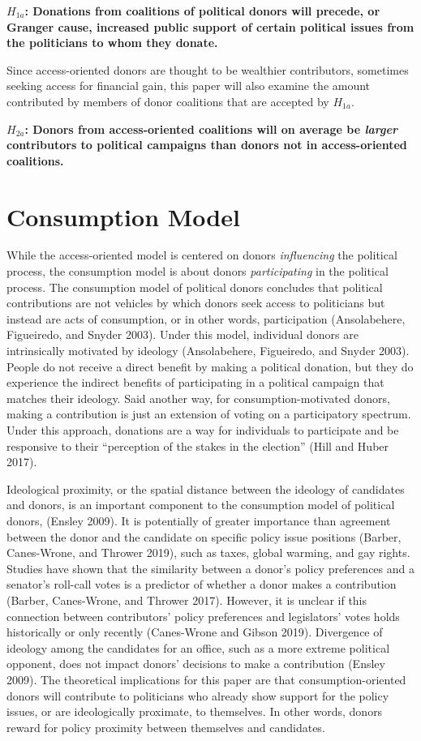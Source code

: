 \documentclass[12pt,]{article}
\begin{document}
\textbf{\(H_{1a}\): Donations from coalitions of political donors will
precede, or Granger cause, increased public support of certain political
issues from the politicians to whom they donate.}

Since access-oriented donors are thought to be wealthier contributors,
sometimes seeking access for financial gain, this paper will also
examine the amount contributed by members of donor coalitions that are
accepted by \(H_{1a}\).

\textbf{\(H_{2a}\): Donors from access-oriented coalitions will on
average be \emph{larger} contributors to political campaigns than donors
not in access-oriented coalitions.}

\hypertarget{consumption-model}{%
\section{Consumption Model}\label{consumption-model}}

While the access-oriented model is centered on donors \emph{influencing}
the political process, the consumption model is about donors
\emph{participating} in the political process. The consumption model of
political donors concludes that political contributions are not vehicles
by which donors seek access to politicians but instead are acts of
consumption, or in other words, participation (Ansolabehere, Figueiredo,
and Snyder 2003). Under this model, individual donors are intrinsically
motivated by ideology (Ansolabehere, Figueiredo, and Snyder 2003).
People do not receive a direct benefit by making a political donation,
but they do experience the indirect benefits of participating in a
political campaign that matches their ideology. Said another way, for
consumption-motivated donors, making a contribution is just an extension
of voting on a participatory spectrum. Under this approach, donations
are a way for individuals to participate and be responsive to their
``perception of the stakes in the election'' (Hill and Huber 2017).

Ideological proximity, or the spatial distance between the ideology of
candidates and donors, is an important component to the consumption
model of political donors, (Ensley 2009). It is potentially of greater
importance than agreement between the donor and the candidate on
specific policy issue positions (Barber, Canes-Wrone, and Thrower 2019),
such as taxes, global warming, and gay rights. Studies have shown that
the similarity between a donor's policy preferences and a senator's
roll-call votes is a predictor of whether a donor makes a contribution
(Barber, Canes-Wrone, and Thrower 2017). However, it is unclear if this
connection between contributors' policy preferences and legislators'
votes holds historically or only recently (Canes-Wrone and Gibson 2019).
Divergence of ideology among the candidates for an office, such as a
more extreme political opponent, does not impact donors' decisions to
make a contribution (Ensley 2009). The theoretical implications for this
paper are that consumption-oriented donors will contribute to
politicians who already show support for the policy issues, or are
ideologically proximate, to themselves. In other words, donors reward
for policy proximity between themselves and candidates.
\end{document}
